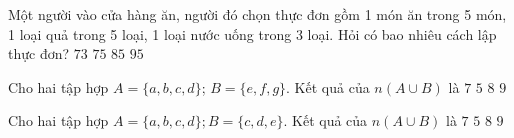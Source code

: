 \begin{ex}%
	Một người vào cửa hàng ăn, người đó chọn thực đơn gồm 1 món ăn trong 5 món, 1 loại quả trong 5 loại, 1 loại nước uống trong 3 loại. Hỏi có bao nhiêu cách lập thực đơn?
	\choice
	{$73$}
	{\True $75$}
	{$85$}
	{$95$}
\end{ex}
\begin{ex}%
	Cho hai tập hợp $A=\{a,b,c,d\}$;  $B=\{e,f,g\}$. Kết quả của $n(A\cup B)$ là
	\choice
	{\True $7$}
	{$5$}
	{$8$}
	{$9$}
\end{ex}
\begin{ex}%
	Cho hai tập hợp $A=\{a,b,c,d\}; B=\{c,d,e\}$. Kết quả của $n(A\cup B)$ là
	\choice
	{$7$}
	{\True $5$}
	{$8$}
	{$9$}
\end{ex}
